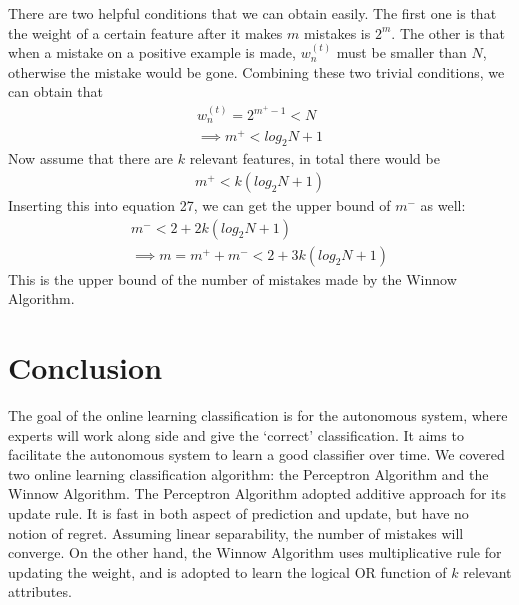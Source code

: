 \documentclass[11pt]{article}
\begin{document}
There are two helpful conditions that we can obtain easily. The first one is that the weight of a certain feature after it makes $m$ mistakes is $2^m$. The other is that when a mistake on a positive example is made, $w_n^{(t)}$ must be smaller than $N$, otherwise the mistake would be gone. Combining these two trivial conditions, we can obtain that
\begin{align}
    w_n^{(t)} = 2^{m^+-1} < N\\
    \implies m^+ < log_2N + 1
\end{align}
Now assume that there are $k$ relevant features, in total there would be
\begin{align}
    m^+ < k(log_2N + 1)
\end{align}
Inserting this into equation 27, we can get the upper bound of $m^-$ as well:
\begin{align}
    m^- < 2 + 2k(log_2N + 1) \\
    \implies m = m^+ + m^- < 2 + 3k(log_2N + 1)
\end{align}
This is the upper bound of the number of mistakes made by the Winnow Algorithm.

\section{Conclusion}
The goal of the online learning classification is for the autonomous system, where experts will work along side and give the `correct' classification. It aims to facilitate the autonomous system to learn a good classifier over time. We covered two online learning classification algorithm: the Perceptron Algorithm and the Winnow Algorithm. The Perceptron Algorithm adopted additive approach for its update rule. It is fast in both aspect of prediction and update, but have no notion of regret. Assuming linear separability, the number of mistakes will converge. On the other hand, the Winnow Algorithm uses multiplicative rule for updating the weight, and is adopted to learn the logical OR function of $k$ relevant attributes. 

{


}


\end{document}
